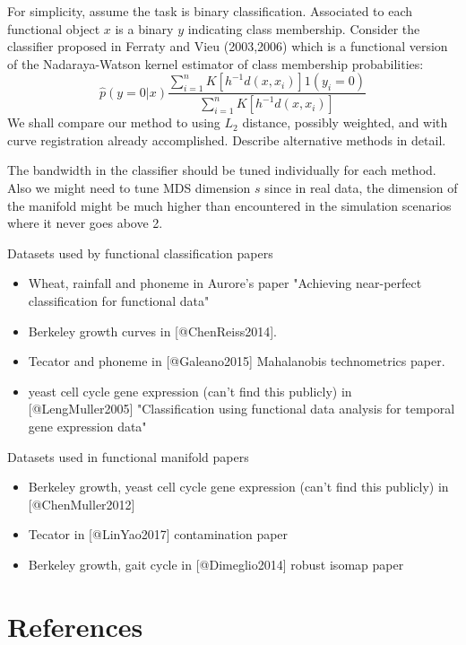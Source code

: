 \documentclass[]{article}
\begin{document}
For simplicity, assume the task is binary classification. Associated to
each functional object \(x\) is a binary \(y\) indicating class
membership. Consider the classifier proposed in Ferraty and Vieu
(2003,2006) which is a functional version of the Nadaraya-Watson kernel
estimator of class membership probabilities: \[
\hat p(y = 0 | x) \frac{ \sum_{i=1}^n K[h^{-1} d(x,x_i)] 1(y_i = 0) }{ \sum_{i=1}^n K[h^{-1} d(x,x_i)] }
\] We shall compare our method to using \(L_2\) distance, possibly
weighted, and with curve registration already accomplished. Describe
alternative methods in detail.

The bandwidth in the classifier should be tuned individually for each
method. Also we might need to tune MDS dimension \(s\) since in real
data, the dimension of the manifold might be much higher than
encountered in the simulation scenarios where it never goes above 2.

Datasets used by functional classification papers

\begin{itemize}
\item Wheat, rainfall and phoneme in Aurore's paper "Achieving near-perfect classification for functional data"
\item Berkeley growth curves in [@ChenReiss2014].
\item Tecator and phoneme in [@Galeano2015] Mahalanobis technometrics paper.
\item yeast cell cycle gene expression (can't find this publicly) in [@LengMuller2005] "Classification using functional data analysis for temporal gene expression data"
\end{itemize}

Datasets used in functional manifold papers

\begin{itemize}
\item Berkeley growth, yeast cell cycle gene expression (can't find this publicly) in [@ChenMuller2012]
\item Tecator in [@LinYao2017] contamination paper
\item Berkeley growth, gait cycle in [@Dimeglio2014] robust isomap paper
\end{itemize}

\hypertarget{references}{%
\section*{References}\label{references}}
\end{document}
